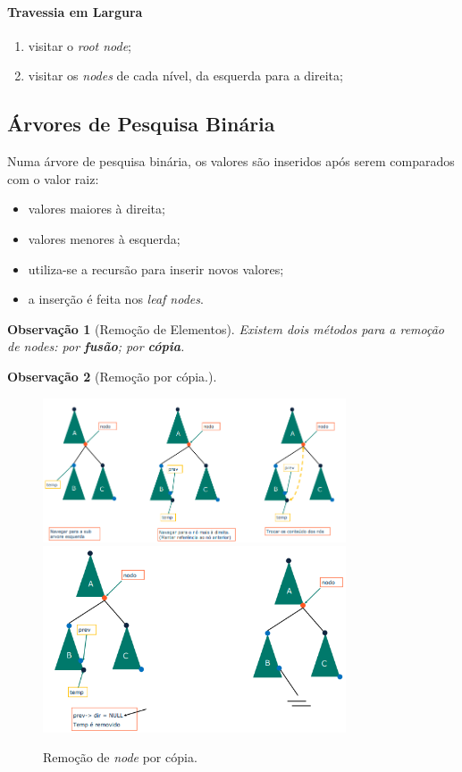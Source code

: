 \documentclass[a4paper, 12pt]{article}
\newtheorem{remark}{Observação}
\begin{document}
\paragraph{Travessia em Largura}
\begin{enumerate}
    \item visitar o \emph{root node};
    \item visitar os \emph{nodes} de cada nível, da esquerda para a direita;
\end{enumerate}

\subsection{Árvores de Pesquisa Binária}
Numa árvore de pesquisa binária, os valores são inseridos após serem comparados com o valor raiz:
\begin{itemize}
    \item valores maiores à direita;
    \item valores menores à esquerda;
    \item utiliza-se a recursão para inserir novos valores;
    \item a inserção é feita nos \emph{leaf nodes}.
\end{itemize}

\begin{remark}[Remoção de Elementos]
    Existem dois métodos para a remoção de \emph{nodes}: por \textbf{fusão}; por \textbf{cópia}.
\end{remark}

\begin{remark}[Remoção por cópia.]
\end{remark}
\begin{figure}[H]
    \centering
    \includegraphics[width=0.8\textwidth]{fig/t/bstRemoveCopy.png}
    \includegraphics[width=0.8\textwidth]{fig/t/bstRemoveCopy2.png}
    \caption{Remoção de \emph{node} por cópia.}
\end{figure}
\end{document}
